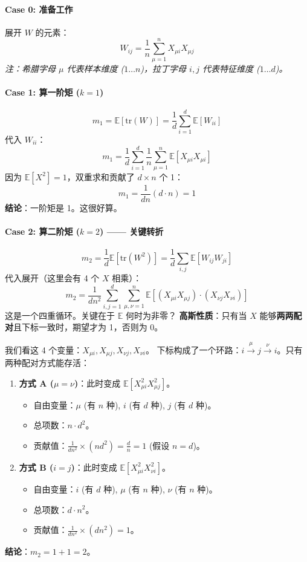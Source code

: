 \documentclass[11pt,a4paper]{ctexart}
\theoremstyle{definition}
\theoremstyle{remark}
\begin{document}
\paragraph{Case 0: 准备工作}
展开 $W$ 的元素：
\[ W_{ij} = \frac{1}{n} \sum_{\mu=1}^n X_{\mu i} X_{\mu j} \]
\textit{注：希腊字母 $\mu$ 代表样本维度 ($1 \dots n$)，拉丁字母 $i, j$ 代表特征维度 ($1 \dots d$)。}

\paragraph{Case 1: 算一阶矩 ($k=1$)}
\[
m_1 = \mathbb{E}[\text{tr}(W)] = \frac{1}{d} \sum_{i=1}^d \mathbb{E}[W_{ii}]
\]
代入 $W_{ii}$：
\[
m_1 = \frac{1}{d} \sum_{i=1}^d \frac{1}{n} \sum_{\mu=1}^n \mathbb{E}[X_{\mu i} X_{\mu i}]
\]
因为 $\mathbb{E}[X^2]=1$，双重求和贡献了 $d \times n$ 个 1：
\[
m_1 = \frac{1}{dn} (d \cdot n) = 1
\]
\textbf{结论}：一阶矩是 1。这很好算。

\paragraph{Case 2: 算二阶矩 ($k=2$) —— 关键转折}
\[
m_2 = \frac{1}{d} \mathbb{E}[\text{tr}(W^2)] = \frac{1}{d} \sum_{i, j} \mathbb{E}[W_{ij} W_{ji}]
\]
代入展开（这里会有 4 个 $X$ 相乘）：
\[
m_2 = \frac{1}{d n^2} \sum_{i, j=1}^d \sum_{\mu, \nu=1}^n \mathbb{E}[ (X_{\mu i} X_{\mu j}) \cdot (X_{\nu j} X_{\nu i}) ]
\]
这是一个四重循环。关键在于 $\mathbb{E}$ 何时为非零？
\textbf{高斯性质}：只有当 $X$ 能够\textbf{两两配对}且下标一致时，期望才为 1，否则为 0。

我们看这 4 个变量：$X_{\mu i}, X_{\mu j}, X_{\nu j}, X_{\nu i}$。
下标构成了一个环路：$i \xrightarrow{\mu} j \xrightarrow{\nu} i$。只有两种配对方式能存活：

\begin{enumerate}
    \item \textbf{方式 A ($\mu = \nu$)}：此时变成 $\mathbb{E}[X_{\mu i}^2 X_{\mu j}^2]$。
    \begin{itemize}
        \item 自由变量：$\mu$ (有 $n$ 种), $i$ (有 $d$ 种), $j$ (有 $d$ 种)。
        \item 总项数：$n \cdot d^2$。
        \item 贡献值：$\frac{1}{d n^2} \times (n d^2) = \frac{d}{n} = 1$ (假设 $n=d$)。
    \end{itemize}
    
    \item \textbf{方式 B ($i = j$)}：此时变成 $\mathbb{E}[X_{\mu i}^2 X_{\nu i}^2]$。
    \begin{itemize}
        \item 自由变量：$i$ (有 $d$ 种), $\mu$ (有 $n$ 种), $\nu$ (有 $n$ 种)。
        \item 总项数：$d \cdot n^2$。
        \item 贡献值：$\frac{1}{d n^2} \times (d n^2) = 1$。
    \end{itemize}
\end{enumerate}
\textbf{结论}：$m_2 = 1 + 1 = 2$。
\end{document}

